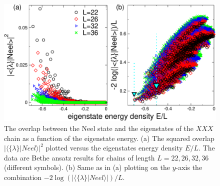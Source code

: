 \documentclass[11pt]{iopart}
\begin{document}
\begin{figure}[t]
\begin{center}
\includegraphics[width=.75\textwidth]{./draft_figs/Neel_over_ener}
\end{center}
\caption{ The overlap between the Neel state and the eigenstates of the 
 $XXX$ chain as a function of the eigenstate energy. (a) The squared 
 overlap $|\langle\{\lambda\}|Neel\rangle|^2$ plotted versus the 
 eigenstates energy density $E/L$. The data are Bethe ansatz results 
 for chains of length $L=22,26,32,36$ (different symbols). (b) Same as 
 in (a) plotting on the $y$-axis the combination $-2\log(|\langle\{
 \lambda\}|Neel\rangle|)/L$. 
}
\label{fig4-neel-ener}
\end{figure}





\end{document}
